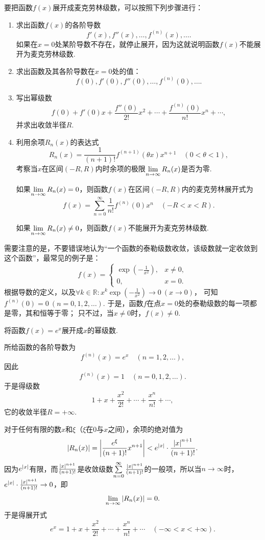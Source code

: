 {\color{red}
要把函数\(f(x)\)展开成麦克劳林级数，可以按照下列步骤进行：
\begin{enumerate}
\item 求出函数\(f(x)\)的各阶导数\[
f'(x),f''(x),\dotsc,f^{(n)}(x),\dotsc.
\]如果在\(x=0\)处某阶导数不存在，就停止展开，因为这就说明函数\(f(x)\)不能展开为麦克劳林级数.
\item 求出函数及其各阶导数在\(x=0\)处的值：\[
f(0),f'(0),f''(0),\dotsc,f^{(n)}(0),\dotsc.
\]
\item 写出幂级数\[
f(0) + f'(0) x + \frac{f''(0)}{2!} x^2 + \dotsb + \frac{f^{(n)}(0)}{n!} x^n + \dotsb,
\]并求出收敛半径\(R\).
\item 利用余项\(R_n(x)\)的表达式\[
R_n(x) = \frac{1}{(n+1)!} f^{(n+1)}(\theta x) x^{n+1} \quad (0 < \theta < 1),
\]考察当\(x\)在区间\((-R,R)\)内时余项的极限\(\lim\limits_{n\to\infty} R_n(x)\)是否为零.

如果\(\lim\limits_{n\to\infty} R_n(x) = 0\)，则函数\(f(x)\)在区间\((-R,R)\)内的麦克劳林展开式为\[
f(x) = \sum\limits_{n=0}^{\infty} \frac{1}{n!} f^{(n)}(0) x^n
\quad (-R < x < R).
\]

如果\(\lim\limits_{n\to\infty} R_n(x) \neq 0\)，则函数\(f(x)\)不能展开为麦克劳林级数.
\end{enumerate}
}

需要注意的是，不要错误地认为“一个函数的泰勒级数收敛，该级数就一定收敛到这个函数”，最常见的例子是：\[
f(x) = \left\{ \begin{array}{ll}
\exp(-\frac{1}{x^2}), & x\neq0, \\
0, & x=0.
\end{array} \right.
\]
根据导数的定义，以及\(\forall k\in\mathbb{R}: x^k \exp(-\frac{1}{x^2}) \to 0\ (x\to0)\)，%
可知\(f^{(n)}(0) = 0\ (n=0,1,2,\dotsc)\).
于是，函数\(f\)在点\(x=0\)处的泰勒级数的每一项都是零，其和恒等于零；
只不过，当\(x\neq0\)时，\(f(x)\neq0\).

\begin{example}
将函数\(f(x) = e^x\)展开成\(x\)的幂级数.
\begin{solution}
所给函数的各阶导数为\[
f^{(n)}(x) = e^x
\quad (n=1,2,\dotsc),
\]因此\[
f^{(n)}(x) = 1
\quad (n=0,1,2,\dotsc).
\]于是得级数\[
1+x+\frac{x^2}{2!}+\dotsb+\frac{x^n}{n!}+\dotsb,
\]它的收敛半径\(R = +\infty\).

对于任何有限的数\(x\)和\(\xi\)（\(\xi\)在\(0\)与\(x\)之间），余项的绝对值为\[
\abs{R_n(x)} = \abs{\frac{e^{\xi}}{(n+1)!} x^{n+1}}
< e^{\abs{x}} \cdot \frac{\abs{x}^{n+1}}{(n+1)!}.
\]因为\(e^{\abs{x}}\)有限，而\(\frac{\abs{x}^{n+1}}{(n+1)!}\)是收敛级数\(\sum\limits_{n=0}^{\infty} \frac{\abs{x}^{n+1}}{(n+1)!}\)的一般项，所以当\(n\to\infty\)时，\(e^{\abs{x}} \cdot \frac{\abs{x}^{n+1}}{(n+1)!}\to0\)，即\[
\lim\limits_{n\to\infty} \abs{R_n(x)} = 0.
\]于是得展开式\[
e^x = 1+x+\frac{x^2}{2!}+\dotsb+\frac{x^n}{n!}+\dotsb
\quad (-\infty<x<+\infty).
\]
\end{solution}
\end{example}

